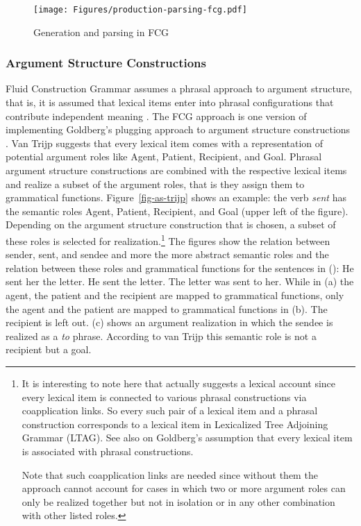 \begin{figure}
\texttt{[image: Figures/production-parsing-fcg.pdf]}
\caption{\label{fig-matching-merging-trijp}Generation and parsing in FCG \citep[]{vanTrijp2013a}}
\end{figure}%

\subsubsection{Argument Structure Constructions}

Fluid Construction Grammar assumes a phrasal approach to argument structure, that is, it is assumed that lexical items enter
into phrasal configurations that contribute independent meaning \citep{vanTrijp2011a}. The FCG
approach is one version of implementing Goldberg's plugging approach to argument structure
constructions \citep{Goldberg95a}. Van Trijp suggests that every lexical item comes with a representation of
potential argument roles like Agent, Patient, Recipient, and Goal. Phrasal argument structure
constructions are combined with the respective lexical items and realize a subset of the argument
roles, that is they assign them to grammatical functions. Figure~\ref{fig-as-trijp} shows an
example: the verb \emph{sent} has the semantic roles Agent, Patient, Recipient, and Goal  (upper left
of the figure). Depending
on the argument structure construction that is chosen, a subset of these roles is selected for
realization.\footnote{%
  It is interesting to note here that \citet[]{vanTrijp2011a} actually suggests a lexical
  account since every lexical item is connected to various phrasal constructions via coapplication
  links. So every such pair of a lexical item and a phrasal construction corresponds to a lexical
  item in Lexicalized Tree Adjoining Grammar (LTAG). See also  on
  Goldberg's assumption that every lexical item is associated with phrasal constructions.

Note that such coapplication links are needed since without them the approach cannot account for
cases in which two or more argument roles can only be realized together but not in isolation or in
any other combination with other listed roles.
}
The figures show the relation between sender, sent, and sendee and more the more abstract semantic
roles and the relation between these roles and grammatical functions for the sentences in ():
\eal
\ex He sent her the letter.
\ex He sent the letter.
\ex The letter was sent to her.
\zl
While in (a) the agent, the patient and the recipient are mapped to grammatical functions,
only the agent and the patient are mapped to grammatical functions in (b). The recipient is
left out. (c) shows an argument realization in which the sendee is realized as a \emph{to}
  phrase. According to van Trijp this semantic role is not a recipient but a goal. 


